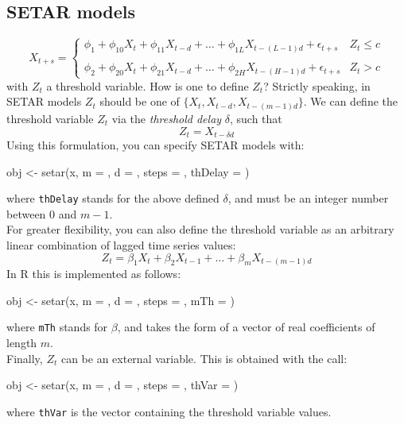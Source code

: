 \documentclass[a4paper]{article}
\begin{document}
\subsection{SETAR models}
\begin{equation}
X_{t+s} = \left\{
\begin{array}{lr}
\phi_1 + \phi_{10} X_t + \phi_{11} X_{t-d} + \ldots + \phi_{1L} X_{t-(L-1)d} + \epsilon_{t+s} & Z_t \leq c\\
\\
\phi_2 + \phi_{20} X_t + \phi_{21} X_{t-d} + \ldots + \phi_{2H} X_{t-(H-1)d} + \epsilon_{t+s} & Z_t > c
\end{array} \right.
\end{equation}
with $Z_t$ a threshold variable. How is one to define $Z_t$? 
Strictly speaking, in SETAR models $Z_t$ should be one of $\{X_t, X_{t-d}, X_{t-(m-1)d}\}$. 
We can define the threshold variable $Z_t$ via the \emph{threshold delay} $\delta$, 
such that 
\[Z_t = X_{t-\delta d}\] 
Using this formulation, you can specify SETAR models with:
\begin{Schunk}
\begin{Sinput}
 obj <- setar(x, m = , d = , steps = , thDelay = )
\end{Sinput}
\end{Schunk}
where \texttt{thDelay} stands for the above defined $\delta$, and must be an integer number between $0$ and $m-1$.\\
For greater flexibility, you can also define the threshold variable as an arbitrary linear combination of lagged time series values:
\[
Z_t = \beta_1 X_t + \beta_2 X_{t-1} + \ldots + \beta_m X_{t-(m-1)d}
\]
In R this is implemented as follows:
\begin{Schunk}
\begin{Sinput}
 obj <- setar(x, m = , d = , steps = , mTh = )
\end{Sinput}
\end{Schunk}
where \texttt{mTh} stands for $\beta$, and takes the form of a vector of real coefficients of length $m$.\\
Finally, $Z_t$ can be an external variable. This is obtained with the call:
\begin{Schunk}
\begin{Sinput}
 obj <- setar(x, m = , d = , steps = , thVar = )
\end{Sinput}
\end{Schunk}
where \texttt{thVar} is the vector containing the threshold variable values.
\end{document}
